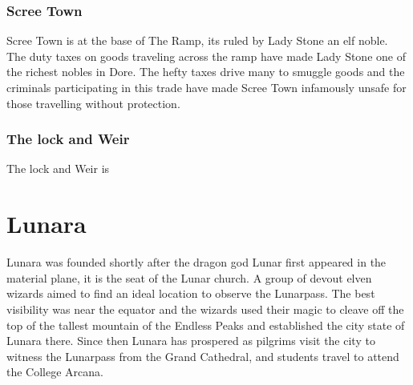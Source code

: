 \documentclass[10pt,twoside,twocolumn,openany,justified,bg=full,nomultitoc]{dndbook}
\begin{document}
\subsection{Scree Town}
\label{sec-4-1-1}
Scree Town is at the base of The Ramp, its ruled by Lady Stone an elf noble. The duty taxes on goods traveling across the ramp have made Lady Stone one of the richest nobles in Dore. The hefty taxes drive many to smuggle goods and the criminals participating in this trade have made Scree Town infamously unsafe for those travelling without protection.
\subsection{The lock and Weir}
\label{sec-4-1-2}
The lock and Weir is 

\chapter{Lunara}
\label{sec-5}
Lunara was founded shortly after the dragon god Lunar first appeared in the material plane, it is the seat of the Lunar church. A group of devout elven wizards aimed to find an ideal location to observe the Lunarpass. The best visibility was near the equator and the wizards used their magic to cleave off the top of the tallest mountain of the Endless Peaks and established the city state of Lunara there. Since then Lunara has prospered as pilgrims visit the city to witness the Lunarpass from the Grand Cathedral, and students travel to attend the College Arcana.\\
\end{document}
